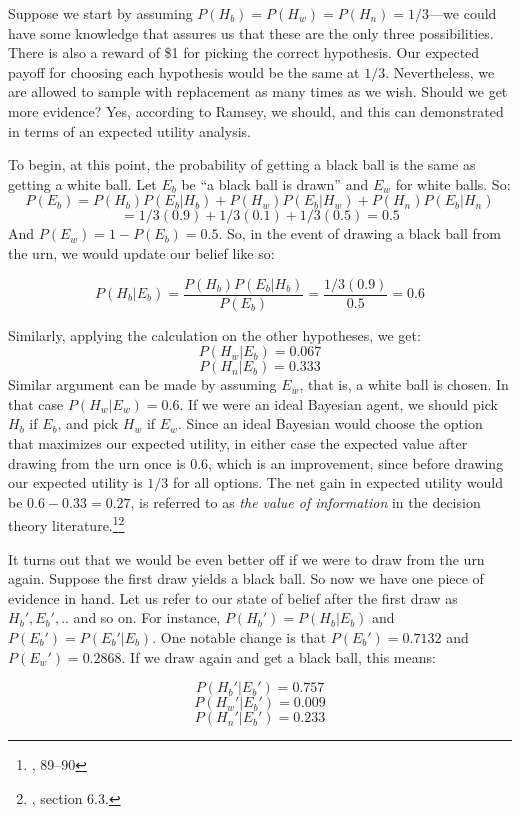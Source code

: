 Suppose we start by assuming \(P(H_b) = P(H_w) = P(H_n) = 1/3\)---we
could have some knowledge that assures us that these are the only three
possibilities. There is also a reward of \$1 for picking the correct
hypothesis. Our expected payoff for choosing each hypothesis would be
the same at \(1/3\). Nevertheless, we are allowed to sample with
replacement as many times as we wish. Should we get more evidence? Yes,
according to Ramsey, we should, and this can demonstrated in terms of an
expected utility analysis.

To begin, at this point, the probability of getting a black ball is the
same as getting a white ball. Let \(E_b\) be ``a black ball is drawn''
and \(E_w\) for white balls. So:
\[P(E_b) = P(H_b)P(E_b|H_b) + P(H_w)P(E_b|H_w) + P(H_n)P(E_b|H_n)\]
\[=1/3(0.9)+1/3(0.1)+1/3(0.5)=0.5\] And \(P(E_w) = 1 - P(E_b) = 0.5\).
So, in the event of drawing a black ball from the urn, we would update
our belief like so:

\[P(H_b|E_b) = \frac{P(H_b)P(E_b|H_b)}{P(E_b)}=\frac{1/3(0.9)}{0.5} = 0.6 \]

Similarly, applying the calculation on the other hypotheses, we get:
\[P(H_w|E_b) = 0.067\] \[P(H_n|E_b) = 0.333\] Similar argument can be
made by assuming \(E_w\), that is, a white ball is chosen. In that case
\(P(H_w|E_w) = 0.6\). If we were an ideal Bayesian agent, we should pick
\(H_b\) if \(E_b\), and pick \(H_w\) if \(E_w\). Since an ideal Bayesian
would choose the option that maximizes our expected utility, in either
case the expected value after drawing from the urn once is \(0.6\),
which is an improvement, since before drawing our expected utility is
\(1/3\) for all options. The net gain in expected utility would be
\(0.6 - 0.33 = 0.27\), is referred to as \emph{the value of information}
in the decision theory literature.\footnote{\cite{appliedstatdec},
  89--90}\footnote{\cite{winkler}, section 6.3.}

It turns out that we would be even better off if we were to draw from
the urn again. Suppose the first draw yields a black ball. So now we
have one piece of evidence in hand. Let us refer to our state of belief
after the first draw as \(H_b', E_b',..\) and so on. For instance,
\(P(H_b') = P(H_b|E_b)\) and \(P(E_b') = P(E_b'|E_b)\). One notable
change is that \(P(E_b') = 0.7132\) and \(P(E_w')=0.2868\). If we draw
again and get a black ball, this means:

\[P(H_b'|E_b') = 0.757\] \[P(H_w'|E_b') = 0.009\]
\[P(H_n'|E_b') = 0.233\]

